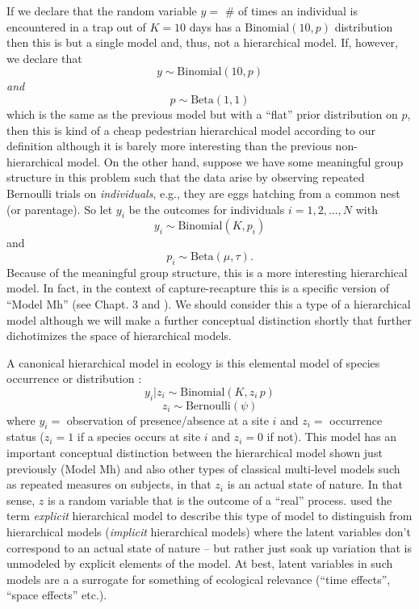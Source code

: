 If we declare that the random variable $y = $ \# of times an
individual is encountered in a trap out of $K=10$ days has a
$\mbox{Binomial}(10, p)$ distribution then this is but a single model and,
thus, not a hierarchical model. If, however, we declare that
\[
y \sim \mbox{Binomial}(10,p)
\]
{\it and}
\[
p \sim \mbox{Beta}(1,1)
\]
which is the same as the previous model but with a ``flat'' prior
distribution on $p$, then this is kind of a cheap pedestrian
hierarchical model according to our definition although it is barely
more interesting than the previous non-hierarchical model.
On the
other hand, suppose we have some meaningful group structure in this
problem such that the data arise by observing repeated Bernoulli
trials on {\it individuals}, e.g., they are eggs hatching from a
common nest (or parentage). So let $y_{i}$ be the outcomes for
individuals $i=1,2,...,N$ with
\[
y_{i} \sim \mbox{Binomial}(K, p_{i})
\]
 and
\[
p_{i}\sim \mbox{Beta}(\mu, \tau).
\]
Because of the meaningful group structure, this is a more interesting
hierarchical model. In fact, in the context of capture-recapture this
is a specific version of ``Model Mh'' (see Chapt. 3 and
\citet{dorazio_royle:2003}).  We should consider this a type of a
hierarchical model although we will make a further conceptual
distinction shortly that further dichotimizes the space of
hierarchical models.

A canonical hierarchical model in ecology is this
elemental model of species occurrence or distribution
\citep{mackenzie_etal:2002, tyre_etal:2003, kery:2011}:
\[
y_{i}|z_{i} \sim \mbox{Binomial}(K,z_{i} \,  p)
\]
\[
z_{i} \sim \mbox{Bernoulli}(\psi)
\]
where  $y_{i} = $ observation of presence/absence at a site $i$ and
$z_{i} = $ occurrence status ($z_{i}=1$ if a species occurs at  site
$i$ and $z_{i}=0$ if not).  This model has an important conceptual
distinction between the hierarchical model shown just previously
(Model Mh) and also other types of classical multi-level models such
as repeated measures on subjects, in that $z_{i}$ is an actual state
of nature. In that sense, $z$ is a random variable that is the outcome of a
``real'' process.   \citet{royle_dorazio:2008} used the term {\it
  explicit} hierarchical model to describe this type of model to
distinguish from hierarchical models ({\it implicit} hierarchical
models) where the latent variables don't
correspond to an actual state of nature -- but rather just soak up
variation that is unmodeled by explicit elements of the model.
At best, latent variables in such models
are a a surrogate for something of ecological relevance
(``time effects'', ``space effects'' etc.).


